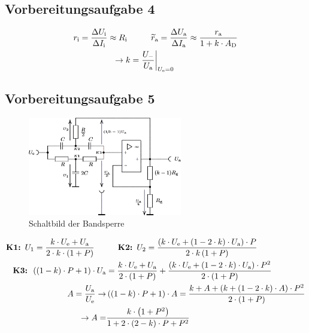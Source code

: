 \documentclass[numbers=noenddot,12pt,a4paper]{scrartcl}
\newcommand{\ix}[1]{_\text{#1}}
\begin{document}
\subsection{Vorbereitungsaufgabe 4}
\begin{align*}
r\ix{i}=\frac{\Delta U\ix{i}}{\Delta I\ix{i}}\approx R\ix{i} \hspace{0.5cm} & \hspace{0.5cm} \widetilde{r}\ix{a}=\frac{\Delta U\ix{a}}{\Delta I\ix{a}}\approx\frac{r\ix{a}}{1+k\cdot A\ix{D}} \\
\rightarrow k=&\left.\frac{U_-}{U\ix{a}}\right|_{U\ix{e}=0}
\end{align*}
\subsection{Vorbereitungsaufgabe 5}
\begin{figure}[H]
\centering
\includegraphics[width=0.6\textwidth]{bandsperre.png}
\caption{Schaltbild der Bandsperre} \label{img:skizze5}
\end{figure}
\begin{align*}
\textbf{K1: } U_1=\frac{k\cdot U\ix{e}+U\ix{a}}{2\cdot k\cdot\left(1+P\right)} \hspace{0.5cm}&\hspace{0.5cm} \textbf{K2: } U_2=\frac{\left(k\cdot U\ix{e}+\left(1-2\cdot k\right)\cdot U\ix{a}\right)\cdot P}{2\cdot k\left(1+P\right)} \\
\textbf{K3: }\left(\left(1-k\right)\cdot P+1\right)\cdot U\ix{a}&=\frac{k\cdot U\ix{e}+U\ix{a}}{2\cdot \left(1+P\right)}+\frac{\left(k\cdot U\ix{e}+\left(1-2\cdot k\right)\cdot U\ix{a}\right)\cdot P^2}{2\cdot\left(1+P\right)} \\
A=\frac{U\ix{a}}{U\ix{e}} \rightarrow & \left(\left(1-k\right)\cdot P+1\right)\cdot A=\frac{k+ A+\left(k+\left(1-2\cdot k\right) \cdot A\right)\cdot P^2}{2\cdot\left(1+P\right)} \\
\rightarrow A=&\frac{k\cdot \left(1+P^2\right)}{1+2\cdot \left(2-k\right)\cdot P+P^2}
\end{align*}
\end{document}
